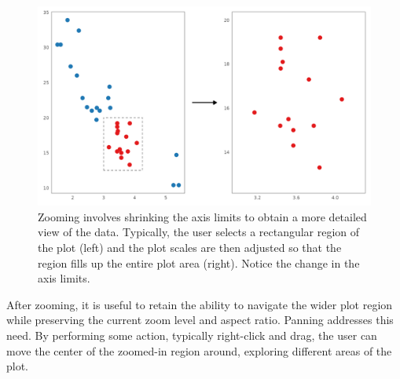 \documentclass[
]{book}
\theoremstyle{definition}
\theoremstyle{definition}
\theoremstyle{definition}
\theoremstyle{definition}
\theoremstyle{remark}
\begin{document}
\begin{figure}

{\centering \includegraphics[width=1\linewidth,height=1\textheight]{./figures/zooming} 

}

\caption{Zooming involves shrinking the axis limits to obtain a more detailed view of the data. Typically, the user selects a rectangular region of the plot (left) and the plot scales are then adjusted so that the region fills up the entire plot area (right). Notice the change in the axis limits.}\label{fig:zooming}
\end{figure}

After zooming, it is useful to retain the ability to navigate the wider plot region while preserving the current zoom level and aspect ratio. Panning addresses this need. By performing some action, typically right-click and drag, the user can move the center of the zoomed-in region around, exploring different areas of the plot.
\end{document}
